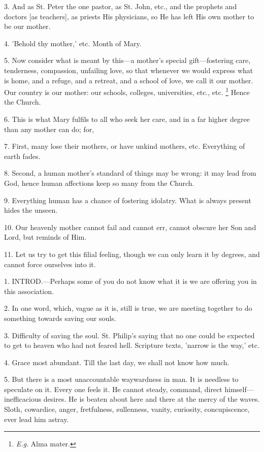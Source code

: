 3. And as St. Peter the one pastor, as St. John,
etc., and the prophets and doctors [as teachers], as priests His
physicians, so He has left His own mother to be our mother.

4. 'Behold thy mother,' etc. Month of Mary.

5. Now consider what is meant by this—a mother's
special gift—fostering care, tenderness, compassion, unfailing love,
so that whenever we would express what is home, and a refuge, and a
retreat, and a school of love, we call it our mother. Our country is
our mother: our schools, colleges, universities, etc., etc. \footnote{\emph{E.g}. Alma mater.} Hence the Church.

6. This is what Mary fulfils to all who seek her
care, and in a far higher degree than any mother can do; for,

7. First, many lose their mothers, or have unkind
mothers, etc. Everything of earth fades.

8. Second, a human mother's standard of things
may be wrong: it may lead from God, hence human affections keep so
many from the Church.

9. Everything human has a chance of fostering
idolatry. What is always present hides the unseen.

10. Our heavenly mother cannot fail and cannot
err, cannot obscure her Son and Lord, but reminds of Him.

11. Let us try to get this filial feeling, though
we can only learn it by degrees, and cannot force ourselves into it.


1. INTROD.—Perhaps
some of you do not know what it is we are offering you in this
association.

2. In one word, which, vague as it is, still is
true, we are meeting together to do something towards saving our
souls.

3. Difficulty of saving the soul. St. Philip's
saying that no one could be expected to get to heaven who had not
feared hell. Scripture texts, 'narrow is the way,' etc.

4. Grace most abundant. Till the last day, we
shall not know how much.

5. But there is a most unaccountable waywardness
in man. It is needless to speculate on it. Every one feels it. He
cannot steady, command, direct himself—inefficacious desires. He is
beaten about here and there at the mercy of the waves. Sloth,
cowardice, anger, fretfulness, sullenness, vanity, curiosity,
concupiscence, ever lead him astray.

